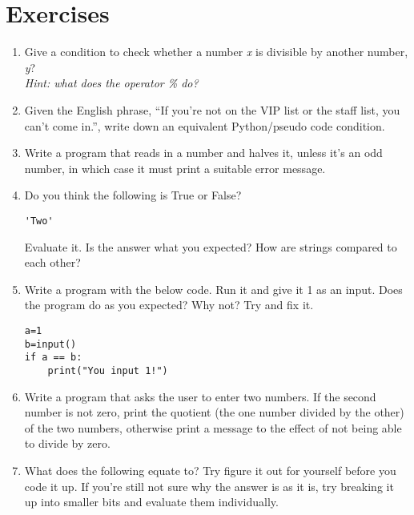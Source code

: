 \section{Exercises}
\begin{enumerate}
	\item Give a condition to check whether a number \textit{x} is divisible by another number, \textit{y}? 
\\\textit{Hint: what does the operator \textit{\%} do?}
	\item Given the English phrase, ``If you're not on the VIP list or    the staff list, you can't come in.'', write down an equivalent Python/pseudo code    condition.
	\item Write a program that reads in a number and halves it, unless it's an odd number, in which case it must print a suitable error  message.
	\item Do you think the following is True or False?    
\begin{lstlisting}
'Two' 
\end{lstlisting}
			Evaluate it. Is the answer what you expected? How are strings compared to each other?
\item Write a program with the below code. Run it and give it 1 as an input. Does the program do as you expected? Why not? Try and fix it.
\begin{lstlisting}
a=1
b=input()
if a == b:
	print("You input 1!")
\end{lstlisting}
\item Write a program that asks the user to enter two numbers. If the
			second number is not zero, print the quotient (the one number divided by the other) of the two numbers,
			otherwise print a message to the effect of not being able to divide
			by zero.
	\item What does the following equate to? Try figure it out for yourself before you code it up. If you're still not sure why the answer is as it is, try breaking it up into smaller bits and evaluate them individually.
			 

\end{enumerate}
